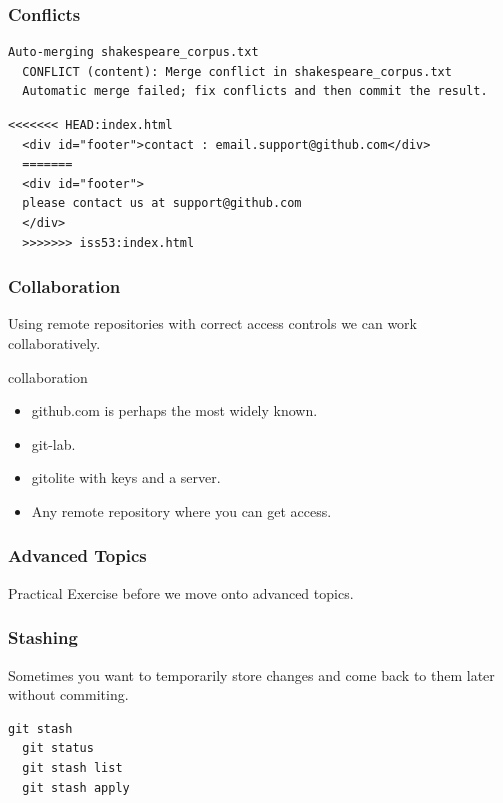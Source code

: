 \documentclass{beamer}
\begin{document}
\begin{frame}[fragile]
  \frametitle{Conflicts}

  \begin{lstlisting}[caption=possible result of a merge] 
  Auto-merging shakespeare_corpus.txt
  CONFLICT (content): Merge conflict in shakespeare_corpus.txt
  Automatic merge failed; fix conflicts and then commit the result.
  \end{lstlisting}

 \begin{lstlisting}[caption=a conflict] 
  <<<<<<< HEAD:index.html
  <div id="footer">contact : email.support@github.com</div>
  =======
  <div id="footer">
  please contact us at support@github.com
  </div>
  >>>>>>> iss53:index.html
 \end{lstlisting}

\end{frame}


\begin{frame}[fragile]
  \frametitle{Collaboration}
  Using remote repositories with correct access controls we can work collaboratively.
 
  \begin{block}{collaboration}
   \begin{itemize}  
      \item github.com is perhaps the most widely known.
      \item git-lab.
      \item gitolite with keys and a server.
      \item Any remote repository where you can get access.
    \end{itemize}
  \end{block}

 

\end{frame}


\begin{frame}[fragile]
  \frametitle{Advanced Topics}
  Practical Exercise before we move onto advanced topics.
\end{frame}




\begin{frame}[fragile]
  \frametitle{Stashing}
  Sometimes you want to temporarily store changes and come back to them later without commiting.

  \begin{lstlisting}[caption=stashing] 
  git stash
  git status
  git stash list
  git stash apply
  \end{lstlisting}

\end{frame}
\end{document}
